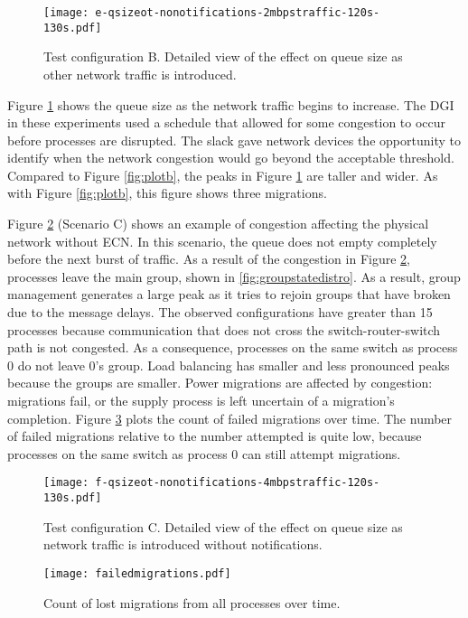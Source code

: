 \begin{figure}[htbp]
\centering
\texttt{[image: e-qsizeot-nonotifications-2mbpstraffic-120s-130s.pdf]}
\caption{Test configuration B. Detailed view of the effect on queue size as other network traffic is introduced.}
\label{fig:plote}
\end{figure}

Figure \ref{fig:plote} shows the queue size as the network traffic begins to increase.
The \ac{DGI} in these experiments used a schedule that allowed for some congestion to occur before processes are disrupted.
The slack gave network devices the opportunity to identify when the network congestion would go beyond the acceptable threshold.
Compared to Figure \ref{fig:plotb}, the peaks in Figure \ref{fig:plote} are taller and wider.
As with Figure \ref{fig:plotb}, this figure shows three migrations.


Figure \ref{fig:plotf} (Scenario C) shows an example of congestion affecting the physical network without \ac{ECN}.
In this scenario, the queue does not empty completely before the next burst of traffic.
As a result of the congestion in Figure \ref{fig:plotf}, processes leave the main group, shown in \ref{fig:groupstatedistro}.
As a result, group management generates a large peak as it tries to rejoin groups that have broken due to the message delays.
The observed configurations have greater than 15 processes because communication that does not cross the switch-router-switch path is not congested.
As a consequence, processes on the same switch as process 0 do not leave 0's group.
Load balancing has smaller and less pronounced peaks because the groups are smaller.
Power migrations are affected by congestion: migrations fail, or the supply process is left uncertain of a migration's completion.
Figure \ref{fig:plotg} plots the count of failed migrations over time.
The number of failed migrations relative to the number attempted is quite low, because processes on the same switch as process 0 can still attempt migrations.

\begin{figure}[h!]
\centering
\texttt{[image: f-qsizeot-nonotifications-4mbpstraffic-120s-130s.pdf]}
\caption{Test configuration C.
Detailed view of the effect on queue size as network traffic is introduced without notifications.}
\label{fig:plotf}
\end{figure}

\begin{figure}[h!]
\vspace{66pt}
\centering
\texttt{[image: failedmigrations.pdf]}
\caption{Count of lost migrations from all processes over time.}
\label{fig:plotg}
\end{figure}



